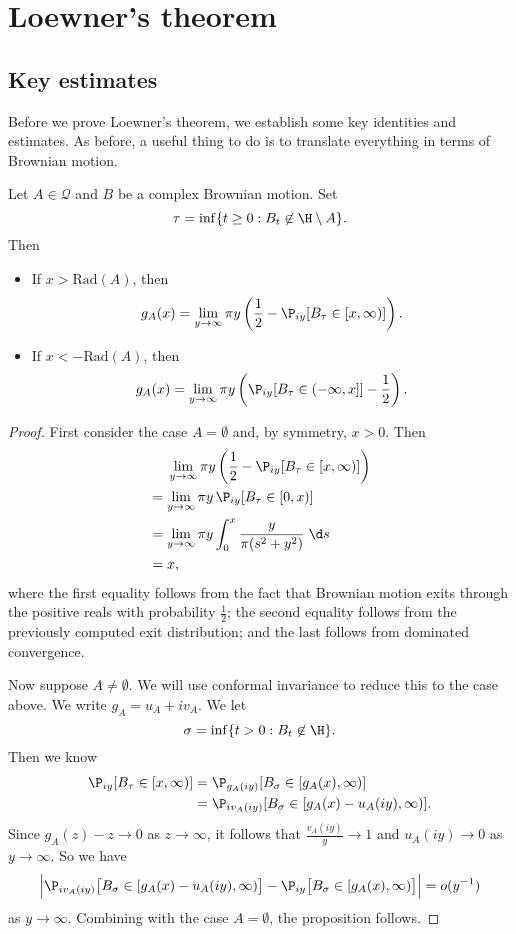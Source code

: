 \documentclass[a4paper]{article}
\newcommand\rad{\mathrm{Rad}}
\begin{document}
\section{Loewner's theorem}
\subsection{Key estimates}
Before we prove Loewner's theorem, we establish some key identities and estimates. As before, a useful thing to do is to translate everything in terms of Brownian motion.
\begin{prop}
  Let $A \in \mathcal{Q}$ and $B$ be a complex Brownian motion. Set
  \[
    \tau = \inf \{t \geq 0: B_t \not \in \H \setminus A\}.
  \]
  Then
  \begin{itemize}
    \item If $x > \rad(A)$, then
      \[
        g_A(x) = \lim_{y \to \infty} \pi y \left(\frac{1}{2} - \P_{iy} [B_\tau \in [x, \infty)]\right).
      \]
    \item If $x < -\rad(A)$, then
      \[
        g_A(x) = \lim_{y \to \infty} \pi y \left(\P_{iy}[B_\tau \in (-\infty, x]] - \frac{1}{2}\right).
      \]
  \end{itemize}
\end{prop}

\begin{proof}
  First consider the case $A = \emptyset$ and, by symmetry, $x > 0$. Then
  \begin{align*}
    &\hphantom{{}={}}\lim_{y \to \infty} \pi y \left(\frac{1}{2} - \P_{iy}[B_\tau \in [x, \infty)]\right)\\
    &= \lim_{y \to \infty} \pi y \,\P_{iy} [B_\tau \in [0, x)]\\
    &=\lim_{y \to \infty} \pi y \int_0^x \frac{y}{\pi (s^2 + y^2)}\;\d s\\
    &= x,
  \end{align*}
  where the first equality follows from the fact that Brownian motion exits through the positive reals with probability $\frac{1}{2}$; the second equality follows from the previously computed exit distribution; and the last follows from dominated convergence.

  Now suppose $A \not= \emptyset$. We will use conformal invariance to reduce this to the case above. We write $g_A = u_A + i v_A$. We let
  \[
    \sigma = \inf \{t > 0: B_t \not \in \H\}.
  \]
  Then we know
  \begin{align*}
    \P_{iy} [B_\tau \in [x, \infty)] &= \P_{g_A(iy)} [B_\sigma \in [g_A(x), \infty)]\\
    &= \P_{iv_A(iy)} [B_\sigma \in [g_A(x) - u_A(iy), \infty)].
  \end{align*}
  Since $g_A(z) - z \to 0$ as $z \to \infty$, it follows that $\frac{v_A(iy)}{y} \to 1$ and $u_A(iy) \to 0$ as $y \to \infty$. So we have
  \[
    \Big|\P_{iv_A(iy)} \big[B_\sigma \in [g_A(x) - u_A(iy), \infty)\big] - \P_{iy}\big[B_\sigma \in [g_A(x), \infty)\big]\Big| = o(y^{-1})
  \]
  as $y \to \infty$. Combining with the case $A = \emptyset$, the proposition follows.
\end{proof}
\end{document}
